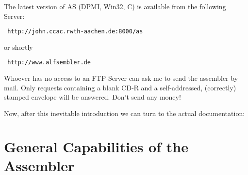 \documentclass[12pt,twoside]{report}
\begin{document}
The latest version of AS (DPMI, Win32, C) is available from
the following Server:
\begin{verbatim}
 http://john.ccac.rwth-aachen.de:8000/as
\end{verbatim}
or shortly
\begin{verbatim}
 http://www.alfsembler.de
\end{verbatim}

Whoever has no access to an FTP-Server can ask me to send the assembler
by mail.  Only requests containing a blank CD-R and a self-addressed,
(correctly) stamped envelope will be answered.  Don't send any money!

Now, after this inevitable introduction we can turn to the actual
documentation:


\section{General Capabilities of the Assembler}
\end{document}
